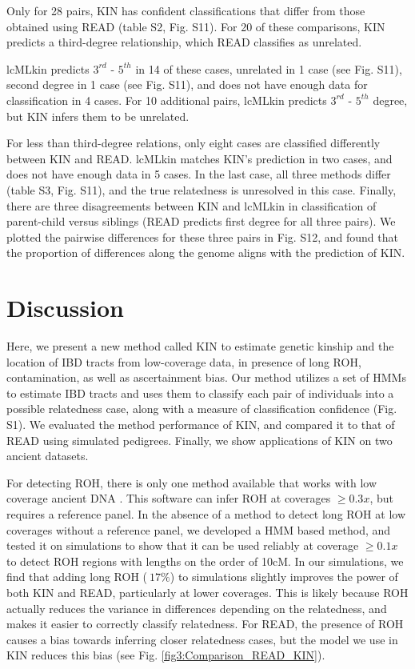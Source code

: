 \documentclass[12pt, letterpaper]{article}
\begin{document}
Only for 28 pairs, KIN has confident classifications that differ from those obtained using READ (table S2, Fig. S11). For 20 of these comparisons, KIN predicts a third-degree relationship, which READ classifies as unrelated. 

lcMLkin predicts $3^{rd}$ - $5^{th}$ in 14 of these cases, unrelated in 1 case (see Fig. S11), second degree in 1 case (see Fig. S11), and does not have enough data for classification in 4 cases. For 10 additional pairs, lcMLkin predicts $3^{rd}$ - $5^{th}$ degree, but KIN infers them to be unrelated.

For less than third-degree relations, only eight cases are classified differently between KIN and READ. lcMLkin matches KIN's prediction in two cases, and does not have enough data in 5 cases. In the last case, all three methods differ (table S3, Fig. S11), and the true relatedness is unresolved in this case. Finally, there are three disagreements between KIN and lcMLkin in classification of parent-child versus siblings (READ predicts first degree for all three pairs). We plotted the pairwise differences for these three pairs in Fig. S12, and found that the proportion of differences along the genome aligns with the prediction of KIN.



\section{Discussion}\label{discussion}
Here, we present a new method called KIN to estimate genetic kinship and the location of IBD tracts from low-coverage data, in presence of long ROH, contamination, as well as ascertainment bias. Our method utilizes a set of HMMs to estimate IBD tracts and uses them to classify each pair of individuals into a possible relatedness case, along with a measure of classification confidence (Fig. S1). We evaluated the method performance of KIN, and compared it to that of READ using simulated pedigrees. Finally, we show applications of KIN on two ancient datasets.

For detecting ROH, there is only one method available that works with low coverage ancient DNA \cite{ringbauer_parental_2021}. This software can infer ROH at coverages $\geq0.3x$, but requires a reference panel. In the absence of a method to detect long ROH at low coverages without a reference panel, we developed a HMM based method, and tested it on simulations to show that it can be used reliably at coverage $\geq 0.1x$ to detect ROH regions with lengths on the order of 10cM. 
In our simulations, we find that adding long ROH ($~17\%$) to simulations slightly improves the power of both KIN and READ, particularly at lower coverages. This is likely because ROH actually reduces the variance in differences depending on the relatedness, and makes it easier to correctly classify relatedness. For READ, the presence of ROH causes a bias towards inferring closer relatedness cases, but the model we use in KIN reduces this bias (see Fig. \ref{fig3:Comparison_READ_KIN}). 
\end{document}
